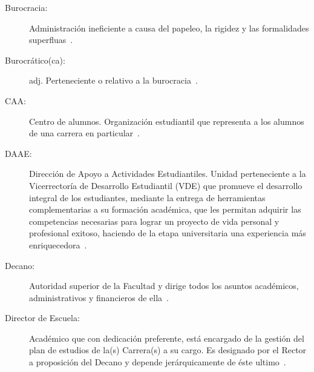 \begin{glosario}
	\item 	\begin{description}
		\item[Burocracia:] Administración ineficiente a causa del papeleo, la rigidez y las 
		formalidades superfluas~\cite{16}.
	\end{description}

	\item 	\begin{description}
		\item[Burocrático(ca):] adj. Perteneciente o relativo a la burocracia~\cite{15}.
	\end{description}

	\item 	\begin{description}
		\item[CAA:] Centro de alumnos. Organización estudiantil que representa a los alumnos de una carrera en particular~\cite{3}.
	\end{description}

	\item 	\begin{description}
		\item[DAAE:] Dirección de Apoyo a Actividades Estudiantiles. Unidad perteneciente a la Vicerrectoría de Desarrollo Estudiantil (VDE) que promueve el desarrollo integral de los estudiantes, mediante la entrega de herramientas complementarias a su formación académica, que les permitan adquirir las competencias necesarias para lograr un proyecto de vida personal y profesional exitoso, haciendo de la etapa universitaria una experiencia más enriquecedora~\cite{1}.
	\end{description}

	\item 	\begin{description}
		\item[Decano:] Autoridad superior de la Facultad y dirige todos los asuntos académicos, administrativos y financieros de ella~\cite{1}.
	\end{description}

	\item 	\begin{description}
		\item[Director de Escuela:] Académico que con dedicación preferente, está encargado de la gestión del plan de estudios de la(s) Carrera(s) a su cargo. Es designado por el Rector a proposición del Decano y depende jerárquicamente de éste ultimo~\cite{1}.	
	\end{description}


\end{glosario}
